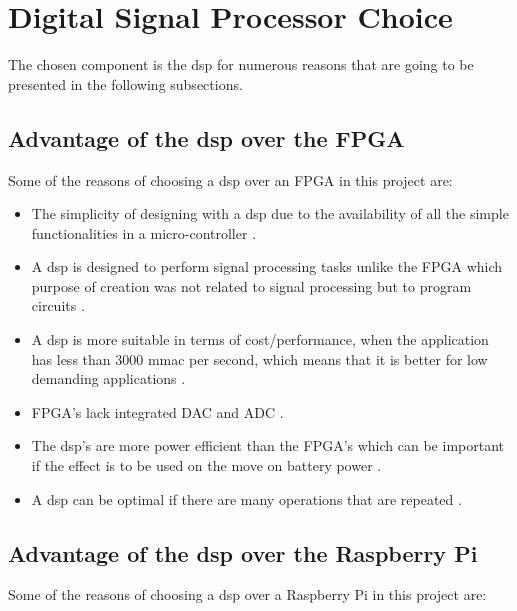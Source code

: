 \section{Digital Signal Processor Choice}

The chosen component is the \gls{dsp} for numerous reasons that are going to be presented in the following subsections.

\subsection{Advantage of the \gls{dsp} over the FPGA}

Some of the  reasons of choosing a \gls{dsp} over an FPGA in this project are:
 
\begin{itemize}

\item  The simplicity of designing with a \gls{dsp} due to the availability of all the simple functionalities in a micro-controller \citep{eetimes}. 

\item A \gls{dsp} is designed to perform signal processing tasks unlike the FPGA which purpose of creation was not related to signal processing but to program circuits \citep{eetimes}. 

\item A \gls{dsp} is more suitable in terms of cost/performance, when the application has less than 3000 \gls{mmac} per second, which means that it is better for low demanding applications \citep{eetimes}. 

\item FPGA's lack integrated DAC and ADC \citep{eetimes}. 

\item The \gls{dsp}'s are more power efficient than the FPGA's which can be important if the effect is to be used on the move on battery power \citep{rtcmag}. 

\item A \gls{dsp} can be optimal if there are many operations that are repeated \citep{eetimes} \citep{hunteng}. 

\end{itemize}

\subsection{Advantage of the \gls{dsp} over the Raspberry Pi}

Some of the  reasons of choosing a \gls{dsp} over a Raspberry Pi in this project are:
 
